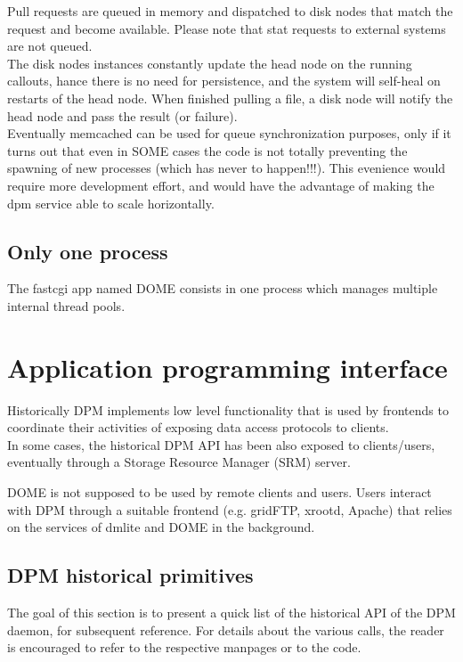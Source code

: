 \documentclass[a4paper,10pt]{scrreprt}
\begin{document}
Pull requests are queued in memory and dispatched to disk nodes that match the request and become available. Please note that stat requests to external systems are not queued.\\
The disk nodes instances constantly update the head node on the running callouts, hance there is no need for persistence,
and the system will self-heal on restarts of the head node. When finished pulling a file, a disk node will notify the head node and pass the result (or failure).\\

Eventually memcached can be used for queue synchronization purposes, only if it turns out that even in SOME cases the code is not totally
preventing the spawning of new processes (which has never to happen!!!). This evenience would require more development effort, and would have the
advantage of making the dpm service able to scale horizontally.\\

\subsection{Only one process}
 The fastcgi app named DOME consists in one process which manages multiple internal thread pools.\\

 


\section{Application programming interface}

Historically DPM implements low level functionality that is used by frontends to coordinate
their activities of exposing data access protocols to clients.\\
In some cases, the historical DPM API has been also exposed to clients/users, eventually through a
Storage Resource Manager (SRM) server.

DOME is not supposed to be used by remote clients and users. Users interact with DPM through a suitable frontend (e.g. gridFTP, xrootd, Apache) that
relies on the services of dmlite and DOME in the background.

\subsection{DPM historical primitives}
 The goal of this section is to present a quick list of the historical API of the DPM daemon, for subsequent reference.
 For details about the various calls, the reader is encouraged to refer to the respective manpages or to the code.
\end{document}
